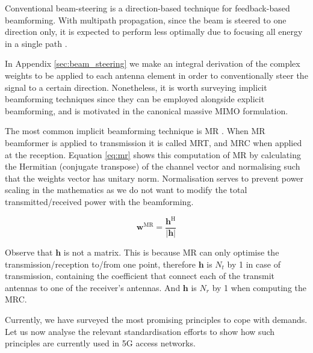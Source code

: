Conventional beam-steering \cite{balanis_antennas} is a direction-based technique for feedback-based beamforming. With multipath propagation, since the beam is steered to one direction only, it is expected to perform less optimally due to focusing all energy in a single path \cite{6292865}. %

In Appendix \ref{sec:beam_steering} we make an integral derivation of the complex weights to be applied to each antenna element in order to conventionally steer the signal to a certain direction. Nonetheless, it is worth surveying implicit beamforming techniques since they can be employed alongside explicit beamforming, and is motivated in the canonical massive MIMO formulation.

The most common implicit beamforming technique is \ac{MR} \cite{795811}. When \ac{MR} beamformer is applied to transmission it is called \ac{MRT}, and \ac{MRC} when applied at the reception. Equation \ref{eq:mr} shows this computation of \ac{MR} by calculating the Hermitian (conjugate transpose) of the channel vector and normalising such that the weights vector has unitary norm. Normalisation serves to prevent power scaling in the mathematics as we do not want to modify the total transmitted/received power with the beamforming.

\begin{equation} \label{eq:mr}
    \bm{w}^\text{MR} = \frac{\bm{h}^\text{H}}{|\bm{h}|}
\end{equation}

Observe that $\bm{h}$ is not a matrix. This is because \ac{MR} can only optimise the transmission/reception to/from one point, therefore $\bm{h}$ is $N_t$ by 1 in case of transmission, containing the coefficient that connect each of the transmit antennas to one of the receiver's antennas. And $\bm{h}$ is $N_r$ by 1 when computing the \ac{MRC}.

Currently, we have surveyed the most promising principles to cope with demands. Let us now analyse the relevant standardisation efforts to show how such principles are currently used in 5G access networks.
